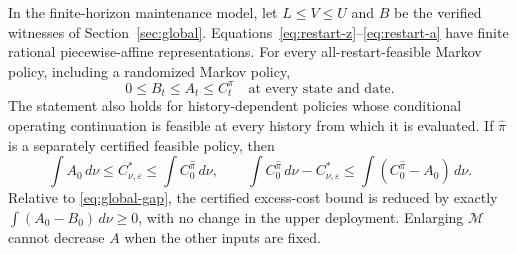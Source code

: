 \begin{theorem}\label{thm:restart}
In the finite-horizon maintenance model, let $L\le V\le U$ and $B$ be the verified witnesses of Section~\ref{sec:global}. Equations~\eqref{eq:restart-z}--\eqref{eq:restart-a} have finite rational piecewise-affine representations. For every all-restart-feasible Markov policy, including a randomized Markov policy,
\begin{equation}\label{eq:restart-order}
 0\le B_t\le A_t\le C_t^\pi\quad\text{at every state and date}.
\end{equation}
The statement also holds for history-dependent policies whose conditional operating continuation is feasible at every history from which it is evaluated. If $\widehat\pi$ is a separately certified feasible policy, then
\begin{equation}\label{eq:restart-gap}
 \int A_0\,d\nu\le C^*_{\nu,\varepsilon}\le\int C_0^{\widehat\pi}\,d\nu,
 \qquad
 \int C_0^{\widehat\pi}\,d\nu-C^*_{\nu,\varepsilon}
 \le\int(C_0^{\widehat\pi}-A_0)\,d\nu.
\end{equation}
Relative to \eqref{eq:global-gap}, the certified excess-cost bound is reduced by exactly $\int(A_0-B_0)\,d\nu\ge0$, with no change in the upper deployment. Enlarging $\mathcal M$ cannot decrease $A$ when the other inputs are fixed.
\end{theorem}
